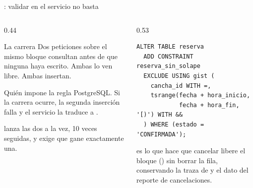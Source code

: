 \begin{frame}[fragile]{: validar en el servicio no basta}

  \begin{columns}[T]
    \begin{column}{0.44\textwidth}
      \begin{block}{La carrera}
        \scriptsize
        Dos peticiones sobre el mismo bloque consultan antes de que ninguna
        haya escrito. Ambas lo ven libre. Ambas insertan.
      \end{block}
      \begin{block}{Quién impone la regla}
        \scriptsize
        PostgreSQL. Si la carrera ocurre, la segunda inserción falla y el
        servicio la traduce a .
      \end{block}
      {\scriptsize\color{textoSuave}  lanza las dos
      a la vez, 10 veces seguidas, y exige que gane exactamente una.}
    \end{column}
    \begin{column}{0.53\textwidth}
      \begin{lstlisting}[language=sql-pg,basicstyle=\ttfamily\tiny]
ALTER TABLE reserva
  ADD CONSTRAINT reserva_sin_solape
  EXCLUDE USING gist (
    cancha_id WITH =,
    tsrange(fecha + hora_inicio,
            fecha + hora_fin, '[)') WITH &&
  ) WHERE (estado = 'CONFIRMADA');
      \end{lstlisting}
      {\scriptsize\color{textoSuave}
       es lo que hace que cancelar libere el
      bloque () sin borrar la fila, conservando la traza de  y
      el dato del reporte de cancelaciones.}
    \end{column}
  \end{columns}
\end{frame}
